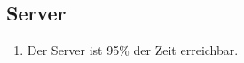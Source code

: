 \subsection{Server}

\begin{enumerate}
    \item Der Server ist 95\% der Zeit erreichbar.
\end{enumerate}